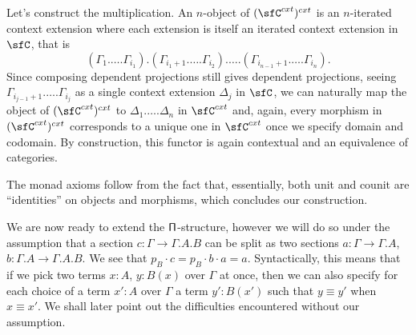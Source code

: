\begin{construction}
  Let's construct the multiplication. An $n$-object of $(\sfC^{cxt})^{cxt}$ is an
  $n$-iterated context extension where each extension is itself an iterated
  context extension in $\sfC$, that is
  \[(\Gamma_1.\ldots.\Gamma_{i_1}).(\Gamma_{i_1+1}.\ldots.\Gamma_{i_2}).\ldots.(\Gamma_{i_{n-1}+1}.\ldots.\Gamma_{i_n}).\]
  Since composing dependent projections still gives dependent projections,
  seeing $\Gamma_{i_{j-1}+1}.\ldots.\Gamma_{i_j}$ as a single context extension
  $\Delta_j$ in $\sfC$, we can naturally
  map the object of $(\sfC^{cxt})^{cxt}$ to $\Delta_1.\ldots.\Delta_n$ in
  $\sfC^{cxt}$ and, again, every morphism
  in $(\sfC^{cxt})^{cxt}$ corresponds to a unique one in $\sfC^{cxt}$ once we
  specify domain and codomain. By construction, this functor is again contextual
  and an equivalence of categories.

  The monad axioms follow from the fact that, essentially, both unit and counit
  are ``identities'' on objects and morphisms, which concludes our construction.
\end{construction}

We are now ready to extend the $\operatorname{\mathsf{\Pi}}$-structure, however we will do so under the
assumption that a section $c\colon\Gamma\rightarrow\Gamma.A.B$ can be split as
two sections $a\colon\Gamma\rightarrow\Gamma.A$,
$b\colon\Gamma.A\rightarrow\Gamma.A.B$.
We see that $p_B\cdot c=p_B\cdot b\cdot a=a$. Syntactically, this means that if
we pick two terms $x:A$, $y:B(x)$ over $\Gamma$ at once, then we can also
specify for each choice of a term $x':A$ over $\Gamma$ a term $y':B(x')$ such
that $y\equiv y'$ when $x\equiv x'$. We shall later point out the
difficulties encountered without our assumption.

